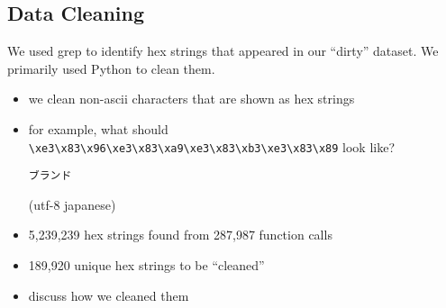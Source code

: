 \subsection{Data Cleaning}
We used grep to identify hex strings that appeared in our ``dirty'' dataset.
We primarily used Python to clean them.
\begin{itemize}[nolistsep]
	\item we clean non-ascii characters that are shown as hex strings
	\item for example, what should \texttt{\textbackslash xe3\textbackslash x83\textbackslash x96\textbackslash xe3\textbackslash x83\textbackslash xa9\textbackslash xe3\textbackslash x83\textbackslash xb3\textbackslash xe3\textbackslash x83\textbackslash x89} look like? \begin{CJK}{UTF8}{gbsn}\texttt{ブランド}\end{CJK} (utf-8 japanese)
	\item 5,239,239 hex strings found from 287,987 function calls
	\item 189,920 unique hex strings to be ``cleaned''
	\item discuss how we cleaned them
\end{itemize}
